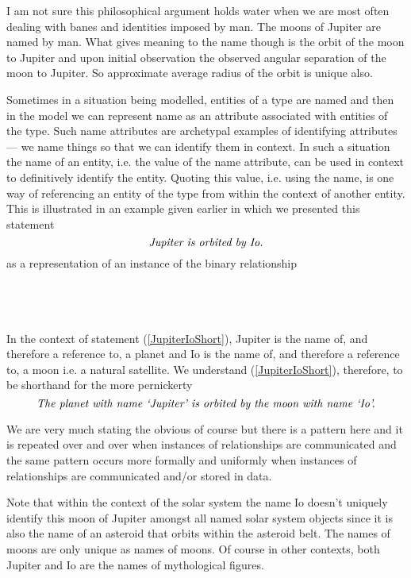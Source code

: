 \mynote 
I am not sure this philosophical argument holds water when we are most often dealing with banes and identities imposed by man. The moons of Jupiter are named by man. What gives meaning to the name though is the orbit of the moon to Jupiter and upon initial observation the observed angular separation of the moon to Jupiter. So approximate average radius of the orbit is unique also. 

\mynote
Sometimes in a situation being modelled, entities of a type are named and then in the model
we can represent name as an attribute associated with entities of the type.  
Such name attributes are archetypal examples of identifying attributes --- we name things so that we can identify them in context. In such a situation the name of an entity, i.e. the value of the name attribute,  can be used in context to definitively identify the entity.
Quoting this value, i.e. using the name, is one way of referencing an entity of the type from within the context of another entity. This is illustrated in  an example given earlier in which we presented this statement
\begin{equation}
\label{JupiterIoShort}
\mbox{\textit{Jupiter is orbited by Io.}}
\end{equation}
as a representation of an instance of the binary relationship
\begin{gather}
\label{planetMoon}
\raisebox{-1cm}{

}
\end{gather}

In the context of statement (\ref{JupiterIoShort}), Jupiter is the name of, and therefore  a reference to, a planet and  Io is the name of, and therefore a reference to, a moon i.e. a natural satellite.  
We understand  (\ref{JupiterIoShort}), therefore, to be shorthand for the 
more pernickerty 
\begin{equation}
\mbox{\textit{The planet with name `Jupiter' is orbited by the moon with name `Io'.}}
\end{equation}

\mynote
We are very much stating the obvious of course but there is a pattern here and it is repeated over and over when instances of relationships are communicated  and the same pattern occurs more formally  and uniformly when instances of relationships are communicated and/or stored in data.

\mynote
Note that within the context of the solar system the name Io  doesn't uniquely identify this moon of Jupiter amongst all named solar system objects since it is also the name of an asteroid that orbits within the asteroid belt.
The names of moons are only unique as names of moons. 
Of course in other contexts, both Jupiter and Io are the names of mythological figures. 


